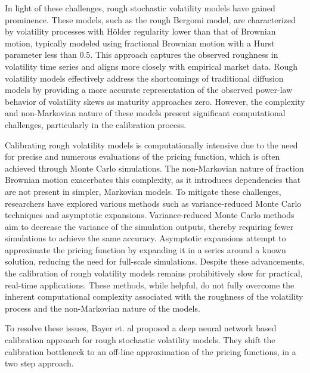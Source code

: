 \documentclass{article}
\theoremstyle{remark}
\begin{document}
In light of these challenges, rough stochastic volatility models have gained prominence.
These models, such as the rough Bergomi model, are characterized by volatility processes with H\"older regularity lower
than that of Brownian motion, typically modeled using fractional Brownian motion with a Hurst parameter less than 0.5.
This approach captures the observed roughness in volatility time series and aligns more closely with empirical market data.
Rough volatility models effectively address the shortcomings of traditional diffusion models by providing a more accurate
representation of the observed power-law behavior of volatility skews as maturity approaches zero.
However, the complexity and non-Markovian nature of these models present significant computational challenges,
particularly in the calibration process.

Calibrating rough volatility models is computationally intensive due to the need for precise and numerous evaluations
of the pricing function, which is often achieved through Monte Carlo simulations.
The non-Markovian nature of fraction Brownian motion exacerbates this complexity, as it introduces dependencies
that are not present in simpler, Markovian models.
To mitigate these challenges, researchers have explored various methods such as variance-reduced Monte Carlo techniques and asymptotic expansions.
Variance-reduced Monte Carlo methods aim to decrease the variance of the simulation outputs,
thereby requiring fewer simulations to achieve the same accuracy.
Asymptotic expansions attempt to approximate the pricing function by expanding it in a series around a known solution, reducing the need
for full-scale simulations.
Despite these advancements, the calibration of rough volatility models remains prohibitively slow for practical, real-time applications.
These methods, while helpful, do not fully overcome the inherent computational complexity associated with the roughness
of the volatility process and the non-Markovian nature of the models.

To resolve these issues, Bayer et. al \cite{BHMST19} proposed a deep neural network based calibration approach for rough stochastic volatility models.
They shift the calibration bottleneck to an off-line approximation of the pricing functions, in a two step approach.
\end{document}
